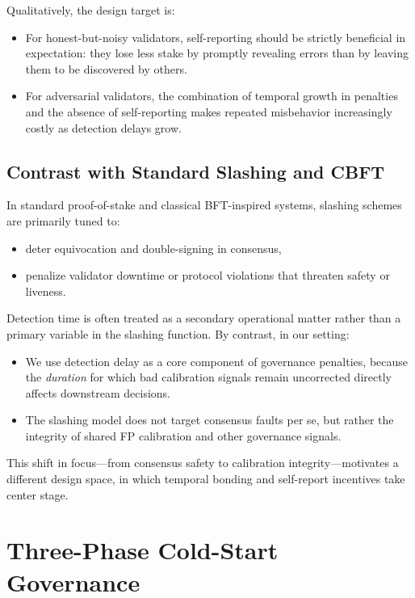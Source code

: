 \documentclass[11pt]{article}
\begin{document}
Qualitatively, the design target is:
\begin{itemize}[leftmargin=*]
  \item For honest-but-noisy validators, self-reporting should be strictly beneficial in expectation: they lose less stake by promptly revealing errors than by leaving them to be discovered by others.
  \item For adversarial validators, the combination of temporal growth in penalties and the absence of self-reporting makes repeated misbehavior increasingly costly as detection delays grow.
\end{itemize}

\subsection{Contrast with Standard Slashing and CBFT}

In standard proof-of-stake and classical BFT-inspired systems, slashing schemes are primarily tuned to:
\begin{itemize}[leftmargin=*]
  \item deter equivocation and double-signing in consensus,
  \item penalize validator downtime or protocol violations that threaten safety or liveness.
\end{itemize}

Detection time is often treated as a secondary operational matter rather than a primary variable in the slashing function.
By contrast, in our setting:
\begin{itemize}[leftmargin=*]
  \item We use detection delay as a core component of governance penalties, because the \emph{duration} for which bad calibration signals remain uncorrected directly affects downstream decisions.
  \item The slashing model does not target consensus faults per se, but rather the integrity of shared FP calibration and other governance signals.
\end{itemize}

This shift in focus---from consensus safety to calibration integrity---motivates a different design space, in which temporal bonding and self-report incentives take center stage.

\section{Three-Phase Cold-Start Governance}
\label{sec:cold-start}
\end{document}
